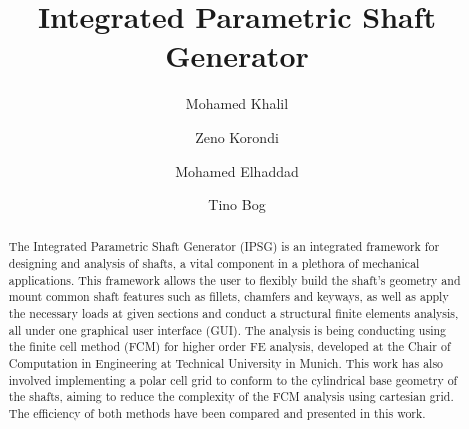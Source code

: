 \title{Integrated Parametric Shaft Generator}


\author[1]{Mohamed Khalil}
\author[1]{Zeno Korondi}
\author[2]{Mohamed Elhaddad}
\author[2]{Tino Bog}


\maketitle

\begin{abstract}
The Integrated Parametric Shaft Generator (IPSG) is an integrated framework for designing and analysis of shafts, a vital component in a plethora of mechanical applications. This framework allows the user to flexibly build the shaft's geometry and mount common shaft features such as fillets, chamfers and keyways, as well as apply the necessary loads at given sections and conduct a structural finite elements analysis, all under one graphical user interface (GUI). The analysis is being conducting using the finite cell method (FCM) for higher order FE analysis, developed at the Chair of Computation in Engineering at Technical University in Munich. This work has also involved implementing a polar cell grid to conform to the cylindrical base geometry of the shafts, aiming to reduce the complexity of the FCM analysis using cartesian grid. The efficiency of both methods have been compared and presented in this work.
\end{abstract}
